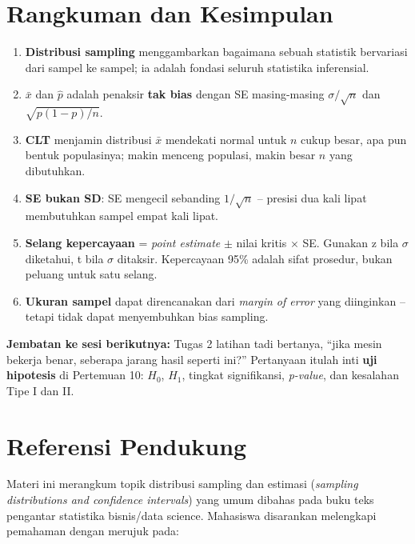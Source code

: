 \documentclass[
  indonesian,
  letterpaper,
]{book}
\providecommand{\tightlist}{%
  \setlength{\itemsep}{0pt}\setlength{\parskip}{0pt}}
\begin{document}
\section{Rangkuman dan Kesimpulan}\label{rangkuman-dan-kesimpulan}

\begin{enumerate}
\def\labelenumi{\arabic{enumi}.}
\tightlist
\item
  \textbf{Distribusi sampling} menggambarkan bagaimana sebuah statistik
  bervariasi dari sampel ke sampel; ia adalah fondasi seluruh statistika
  inferensial.
\item
  \(\bar{x}\) dan \(\hat{p}\) adalah penaksir \textbf{tak bias} dengan
  SE masing-masing \(\sigma/\sqrt{n}\) dan \(\sqrt{p(1-p)/n}\).
\item
  \textbf{CLT} menjamin distribusi \(\bar{x}\) mendekati normal untuk
  \(n\) cukup besar, apa pun bentuk populasinya; makin menceng populasi,
  makin besar \(n\) yang dibutuhkan.
\item
  \textbf{SE bukan SD}: SE mengecil sebanding \(1/\sqrt{n}\) -- presisi
  dua kali lipat membutuhkan sampel empat kali lipat.
\item
  \textbf{Selang kepercayaan} = \emph{point estimate} \(\pm\) nilai
  kritis \(\times\) SE. Gunakan z bila \(\sigma\) diketahui, t bila
  \(\sigma\) ditaksir. Kepercayaan 95\% adalah sifat prosedur, bukan
  peluang untuk satu selang.
\item
  \textbf{Ukuran sampel} dapat direncanakan dari \emph{margin of error}
  yang diinginkan -- tetapi tidak dapat menyembuhkan bias sampling.
\end{enumerate}

\textbf{Jembatan ke sesi berikutnya:} Tugas 2 latihan tadi bertanya,
``jika mesin bekerja benar, seberapa jarang hasil seperti ini?''
Pertanyaan itulah inti \textbf{uji hipotesis} di Pertemuan 10: \(H_0\),
\(H_1\), tingkat signifikansi, \emph{p-value}, dan kesalahan Tipe I dan
II.

\section{Referensi Pendukung}\label{referensi-pendukung}

Materi ini merangkum topik distribusi sampling dan estimasi
(\emph{sampling distributions and confidence intervals}) yang umum
dibahas pada buku teks pengantar statistika bisnis/data science.
Mahasiswa disarankan melengkapi pemahaman dengan merujuk pada:
\end{document}
